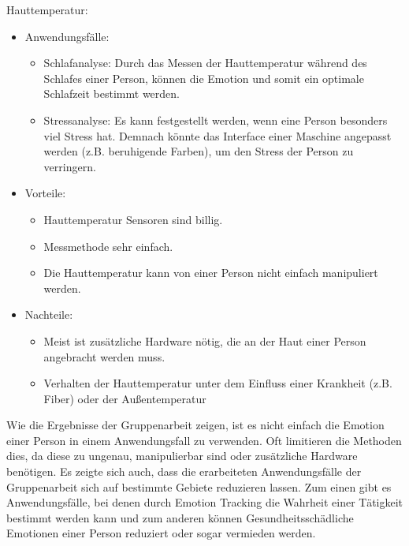 \vspace{2mm}
Hauttemperatur:
\begin{itemize}
	\item Anwendungsfälle:
	\begin{itemize}
		\item Schlafanalyse: Durch das Messen der Hauttemperatur während des Schlafes einer Person, können die Emotion  und somit ein optimale Schlafzeit bestimmt werden.
		\item Stressanalyse: Es kann festgestellt werden, wenn eine Person besonders viel Stress hat. Demnach könnte das Interface einer Maschine angepasst werden (z.B. beruhigende Farben), um den Stress der Person zu verringern.
	\end{itemize}
	\item Vorteile:
	\begin{itemize}
		\item Hauttemperatur Sensoren sind billig.
		\item Messmethode sehr einfach.	 
		\item Die Hauttemperatur kann von einer Person nicht einfach manipuliert werden.
	\end{itemize}
	\item Nachteile:
	\begin{itemize}
		\item Meist ist zusätzliche Hardware nötig, die an der Haut einer Person angebracht werden muss.
		\item Verhalten der Hauttemperatur unter dem Einfluss einer Krankheit (z.B. Fiber) oder der Außentemperatur
	\end{itemize}
\end{itemize}

Wie die Ergebnisse der Gruppenarbeit zeigen, ist es nicht einfach die Emotion einer Person in einem Anwendungsfall zu verwenden. Oft limitieren die Methoden dies, da diese zu ungenau, manipulierbar sind oder zusätzliche Hardware benötigen. Es zeigte sich auch, dass die erarbeiteten Anwendungsfälle der Gruppenarbeit sich auf bestimmte Gebiete reduzieren lassen. Zum einen gibt es Anwendungsfälle, bei denen durch Emotion Tracking die Wahrheit einer Tätigkeit bestimmt werden kann und zum anderen können Gesundheitsschädliche Emotionen einer Person reduziert oder sogar vermieden werden. 

